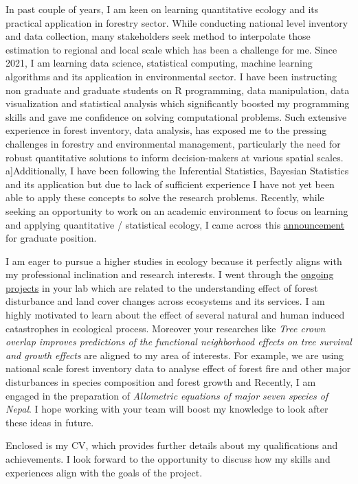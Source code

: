 \documentclass[
]{article}
\begin{document}
In past couple of years, I am keen on learning quantitative ecology and
its practical application in forestry sector. While conducting national
level inventory and data collection, many stakeholders seek method to
interpolate those estimation to regional and local scale which has been
a challenge for me. Since 2021, I am learning data science, statistical
computing, machine learning algorithms and its application in
environmental sector. I have been instructing non graduate and graduate
students on R programming, data manipulation, data visualization and
statistical analysis which significantly boosted my programming skills
and gave me confidence on solving computational problems. Such extensive
experience in forest inventory, data analysis, has exposed me to the
pressing challenges in forestry and environmental management,
particularly the need for robust quantitative solutions to inform
decision-makers at various spatial scales. a{]}Additionally, I have been
following the Inferential Statistics, Bayesian Statistics and its
application but due to lack of sufficient experience I have not yet been
able to apply these concepts to solve the research problems. Recently,
while seeking an opportunity to work on an academic environment to focus
on learning and applying quantitative / statistical ecology, I came
across this \href{https://uriartelab.org/opportunities/}{announcement}
for graduate position.

I am eager to pursue a higher studies in ecology because it perfectly
aligns with my professional inclination and research interests. I went
through the
\href{https://www.columbia.edu/~mu2126/researchprojects.html}{ongoing
projects} in your lab which are related to the understanding effect of
forest disturbance and land cover changes across ecosystems and its
services. I am highly motivated to learn about the effect of several
natural and human induced catastrophes in ecological process. Moreover
your researches like \emph{Tree crown overlap improves predictions of
the functional neighborhood effects on tree survival and growth effects}
are aligned to my area of interests. For example, we are using national
scale forest inventory data to analyse effect of forest fire and other
major disturbances in species composition and forest growth and
Recently, I am engaged in the preparation of \emph{Allometric equations
of major seven species of Nepal}. I hope working with your team will
boost my knowledge to look after these ideas in future.

Enclosed is my CV, which provides further details about my
qualifications and achievements. I look forward to the opportunity to
discuss how my skills and experiences align with the goals of the
project.
\end{document}
